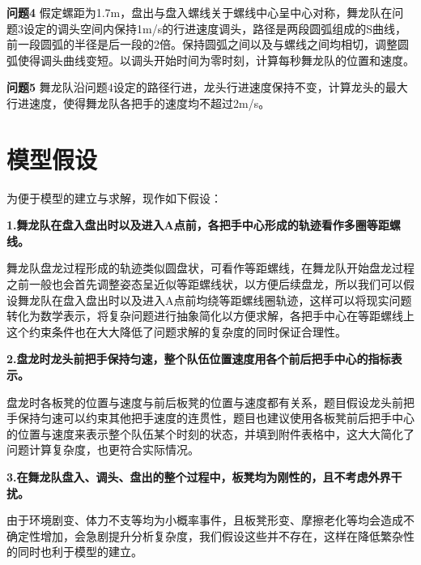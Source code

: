 \documentclass[withoutpreface,bwprint]{cumcmthesis} %
\begin{document}
\textbf{问题4} 假定螺距为1.7m，盘出与盘入螺线关于螺线中心呈中心对称，舞龙队在问题3设定的调头空间内保持1m/s的行进速度调头，路径是两段圆弧组成的S曲线，前一段圆弧的半径是后一段的2倍。保持圆弧之间以及与螺线之间均相切，调整圆弧使得调头曲线变短。以调头开始时间为零时刻，计算每秒舞龙队的位置和速度。

\textbf{问题5} 舞龙队沿问题4设定的路径行进，龙头行进速度保持不变，计算龙头的最大行进速度，使得舞龙队各把手的速度均不超过2m/s。

\section{模型假设}
\noindent 为便于模型的建立与求解，现作如下假设：

\noindent \textbf{1.舞龙队在盘入盘出时以及进入A点前，各把手中心形成的轨迹看作多圈等距螺线。}

舞龙队盘龙过程形成的轨迹类似圆盘状，可看作等距螺线，在舞龙队开始盘龙过程之前一般也会首先调整姿态呈近似等距螺线状，以方便后续盘龙，所以我们可以假设舞龙队在盘入盘出时以及进入A点前均绕等距螺线圈轨迹，这样可以将现实问题转化为数学表示，将复杂问题进行抽象简化以方便求解，各把手中心在等距螺线上这个约束条件也在大大降低了问题求解的复杂度的同时保证合理性。

\noindent \textbf{2.盘龙时龙头前把手保持匀速，整个队伍位置速度用各个前后把手中心的指标表示。}

盘龙时各板凳的位置与速度与前后板凳的位置与速度都有关系，题目假设龙头前把手保持匀速可以约束其他把手速度的连贯性，题目也建议使用各板凳前后把手中心的位置与速度来表示整个队伍某个时刻的状态，并填到附件表格中，这大大简化了问题计算复杂度，也更符合实际情况。

\noindent \textbf{3.在舞龙队盘入、调头、盘出的整个过程中，板凳均为刚性的，且不考虑外界干扰。}

由于环境剧变、体力不支等均为小概率事件，且板凳形变、摩擦老化等均会造成不确定性增加，会急剧提升分析复杂度，我们假设这些并不存在，这样在降低繁杂性的同时也利于模型的建立。


\end{document}
